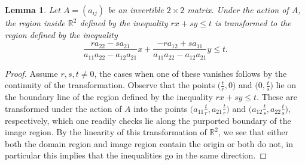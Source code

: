 \documentclass{amsart}
\newtheorem{lemma}[theorem]{Lemma}
\numberwithin{theorem}{section}
\newcommand{\RR}{\mathbb{R}}
\begin{document}
  \begin{lemma}
    \label{le:transformed inequalities}
    Let $A=(a_{ij})$ be an invertible $2\times 2$ matrix.
    Under the action of $A$, the region inside $\RR^2$ defined by the inequality $rx+sy\le t$ is transformed to the region defined by the inequality \[\frac{ra_{22}-sa_{21}}{a_{11}a_{22}-a_{12}a_{21}}x + \frac{-ra_{12}+sa_{11}}{a_{11}a_{22}-a_{12}a_{21}}y\le t.\]
  \end{lemma}
  \begin{proof}
    Assume $r,s,t\ne0$, the cases when one of these vanishes follows by the continuity of the transformation.
    Observe that the points $\big(\frac{t}{r},0\big)$ and $\big(0,\frac{t}{s}\big)$ lie on the boundary line of the region defined by the inequality $rx+sy\le t$.
    These are transformed under the action of $A$ into the points $\big(a_{11}\frac{t}{r},a_{21}\frac{t}{r}\big)$ and $\big(a_{12}\frac{t}{s},a_{22}\frac{t}{s}\big)$, respectively, which one readily checks lie along the purported boundary of the image region.
    By the linearity of this transformation of $\RR^2$, we see that either both the domain region and image region contain the origin or both do not, in particular this implies that the inequalities go in the same direction.
  \end{proof}
  
\end{document}
